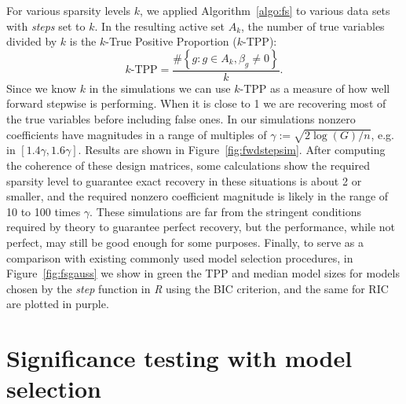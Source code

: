 \documentclass{imsart}
\begin{document}
For various sparsity levels $k$, we applied Algorithm~\ref{algo:fs} to
various data sets with \textit{steps} set to $k$.
In the resulting active set $A_k$, the number of true variables divided by $k$ is the $k$-True Positive Proportion ($k$-TPP):
\[
k\text{-TPP} = \frac{\# \left\{g: g \in A_k, \beta_g \neq 0\right\}}{k}.
\]
Since we know $k$ in the simulations we can use $k$-TPP as a measure of how well forward stepwise is performing. When it is close to 1 we are recovering most of the true variables before including false ones.
In our simulations nonzero coefficients have magnitudes
in a range of multiples of $\gamma := \sqrt{2\log(G)/n}$, e.g. in $[1.4
\gamma, 1.6 \gamma]$. Results are shown in
Figure~\ref{fig:fwdstepsim}. After computing the
coherence of these design matrices, some calculations show the required
sparsity level to guarantee exact recovery in these situations is
about 2 or smaller, and the required nonzero coefficient magnitude is
likely in the range of 10 to 100 times $\gamma$. These simulations are far
from the stringent conditions required by theory to guarantee perfect
recovery, but the performance, while not perfect, may still be good
enough for some purposes. Finally, to serve as a comparison with existing
commonly used model selection procedures, in Figure~\ref{fig:fsgauss}
we show in green the TPP and median model sizes for models chosen by
the \textit{step} function in \textit{R} using the BIC criterion, and
the same for RIC are plotted in purple.



\section{Significance testing with model selection}
\label{sec:testing}
\end{document}
